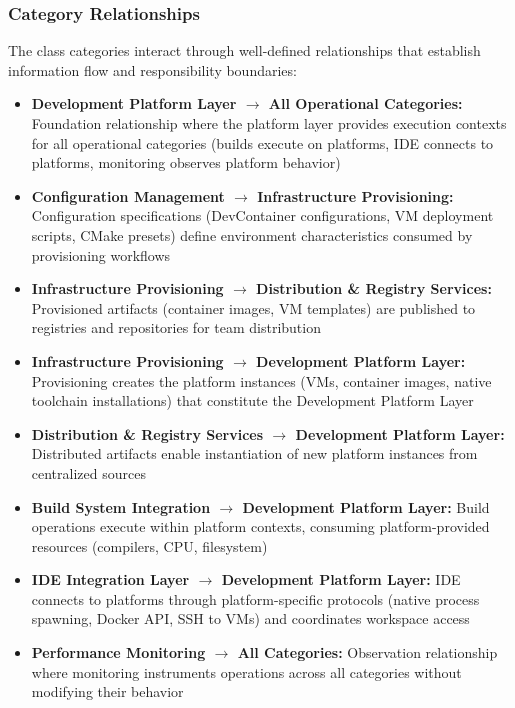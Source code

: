 \subsubsection{Category Relationships}

The class categories interact through well-defined relationships that establish information flow and responsibility boundaries:

\begin{itemize}
\item \textbf{Development Platform Layer $\rightarrow$ All Operational Categories:} Foundation relationship where the platform layer provides execution contexts for all operational categories (builds execute on platforms, IDE connects to platforms, monitoring observes platform behavior)
\item \textbf{Configuration Management $\rightarrow$ Infrastructure Provisioning:} Configuration specifications (DevContainer configurations, VM deployment scripts, CMake presets) define environment characteristics consumed by provisioning workflows
\item \textbf{Infrastructure Provisioning $\rightarrow$ Distribution \& Registry Services:} Provisioned artifacts (container images, VM templates) are published to registries and repositories for team distribution
\item \textbf{Infrastructure Provisioning $\rightarrow$ Development Platform Layer:} Provisioning creates the platform instances (VMs, container images, native toolchain installations) that constitute the Development Platform Layer
\item \textbf{Distribution \& Registry Services $\rightarrow$ Development Platform Layer:} Distributed artifacts enable instantiation of new platform instances from centralized sources
\item \textbf{Build System Integration $\rightarrow$ Development Platform Layer:} Build operations execute within platform contexts, consuming platform-provided resources (compilers, CPU, filesystem)
\item \textbf{IDE Integration Layer $\rightarrow$ Development Platform Layer:} IDE connects to platforms through platform-specific protocols (native process spawning, Docker API, SSH to VMs) and coordinates workspace access
\item \textbf{Performance Monitoring $\rightarrow$ All Categories:} Observation relationship where monitoring instruments operations across all categories without modifying their behavior
\end{itemize}

